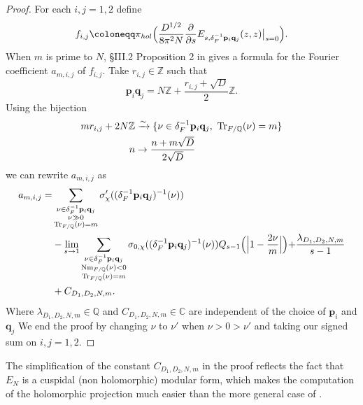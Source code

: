 \documentclass[a4paper,12pt]{article}
\newcommand{\ZZ}{\mathbb{Z}}
\begin{document}
\begin{proof}
   For each $i,j=1,2$ define
\[f_{i,j} \coloneqq\pi_{hol}\Bigl(\frac{D^{1/2}}{8\pi^2N}\frac{\partial}{\partial s}E_{s,\delta_F^{-1}\mathbf{p}_i\mathbf{q}_j}(z,z)\bigl|_{s=0}\Bigl).
   \] 
   When $m$ is prime to $N$, \S III.2 Proposition 2 in \cite{GrossKohnenZagier87} gives a formula for the Fourier coefficient $a_{m,i,j}$ of $f_{i,j}$.
Take $r_{i,j}\in \mathbb{Z}$ such that 
\[ \mathbf{p}_i\mathbf{q}_j=N\mathbb{Z}+\frac{r_{i,j}+\sqrt{D}}{2}\mathbb{Z}.\]
Using the bijection
\begin{equation}
\begin{split}
    mr_{i,j}+2N\ZZ &\xrightarrow{\sim}\{\nu\in\delta_F^{-1}\mathbf{p}_i\mathbf{q}_j,\,\, \textup{Tr}_{F/\mathbb{Q}}(\nu)=m\}
    \\
    n&\rightarrow\frac{n+m\sqrt{D}}{2\sqrt{D}}
    \end{split}
\end{equation}
 we can rewrite $a_{m,i,j}$ as
    \begin{equation}
    \begin{split}
        a_{m,i,j}=&\sum_{\substack{\nu\in \delta_F^{-1}\mathbf{p}_i\mathbf{q}_j\\ \nu\gg0\\ \textup{Tr}_{F/\mathbb{Q}}(\nu)=m}}\sigma'_{\chi}((\delta_F^{-1}\mathbf{p}_i\mathbf{q}_j)^{-1}(\nu))
        \\&-\lim_{s\rightarrow 1} \sum_{\substack{\nu\in \delta_F^{-1}\mathbf{p}_i\mathbf{q}_j\\ \textup{Nm}_{F/\mathbb{Q}}(\nu)<0\\ \textup{Tr}_{F/\mathbb{Q}}(\nu)=m}}\sigma_{0,\chi}((\delta_F^{-1}\mathbf{p}_i\mathbf{q}_j)^{-1}(\nu))Q_{s-1}\Bigl(\Bigl|1-\frac{2\nu}{m}\Bigl|\Bigl) +\frac{\lambda_{D_1,D_2,N,m}}{s-1}
        \\&+C_{D_1,D_2,N,m}.
    \end{split}
    \end{equation}
 Where $\lambda_{D_1,D_2,N,m}\in\mathbb{Q}$ and $C_{D_1,D_2,N,m}\in\mathbb{C}$ are independent of the choice of $\mathbf{p}_i$ and $\mathbf{q}_j$
We end the proof by changing $\nu$ to $\nu'$ when $\nu>0>\nu'$ and taking our signed sum on $i,j=1,2$.
\end{proof}
The simplification of the constant $C_{D_1,D_2,N,m}$ in the proof reflects the fact that $E_{N}$ is a cuspidal (non holomorphic) modular form, which makes the computation of the holomorphic projection much easier than the more general case of \cite{GrossKohnenZagier87}.
\end{document}

